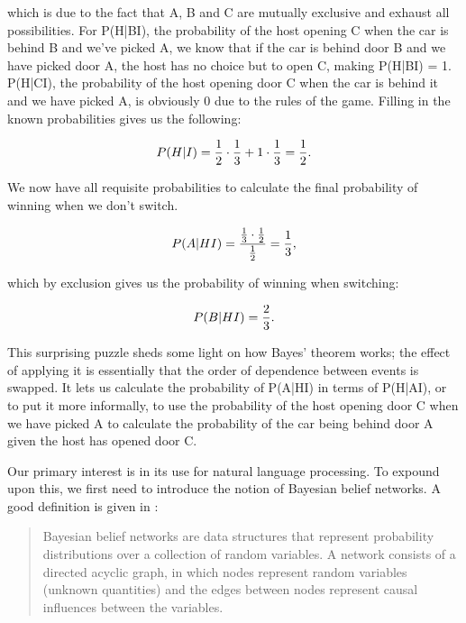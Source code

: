 which is due to the fact that A, B and C are mutually exclusive and exhaust all
possibilities. For P(H|BI), the probability of the host opening C when the car
is behind B and we've picked A, we know that if the car is behind door B and we
have picked door A, the host has no choice but to open C, making P(H|BI) = 1.
P(H|CI), the probability of the host opening door C when the car is behind it
and we have picked A, is obviously 0 due to the rules of the game.  Filling in
the known probabilities gives us the following:

\begin{equation}
  \\P(H|I) = \frac{1}{2} \cdot \frac{1}{3} + 1 \cdot \frac{1}{3} = \frac{1}{2}.
\end{equation}

We now have all requisite probabilities to calculate the final probability of winning when we don't switch.

\begin{equation}
  \\P(A|HI) = \frac{\frac{1}{3} \cdot \frac{1}{2}}{\frac{1}{2}} = \frac{1}{3},
\end{equation}

which by exclusion gives us the probability of winning when switching:

\begin{equation}
  \\P(B|HI) = \frac{2}{3}.
\end{equation}

This surprising puzzle sheds some light on how Bayes' theorem works; the effect
of applying it is essentially that the order of dependence between events is
swapped. It lets us calculate the probability of P(A|HI) in terms of P(H|AI),
or to put it more informally, to use the probability of the host opening door C
when we have picked A to calculate the probability of the car being behind door
A given the host has opened door C.

Our primary interest is in its use for natural language processing. To
expound upon this, we first need to introduce the notion of Bayesian belief
networks. A good definition is given in \citet[80]{bod2004}:

\begin{quote}
Bayesian belief networks are data structures that represent probability
distributions over a collection of random variables. A network consists of a
directed acyclic graph, in which nodes represent random variables (unknown
quantities) and the edges between nodes represent causal influences between the
variables.
\end{quote}

